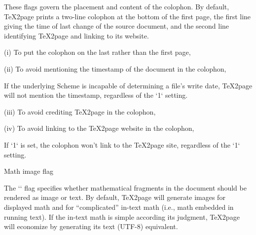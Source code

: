 These flags
govern the placement and content of the colophon.
By default, \TeX2page prints a two-line colophon at the
bottom of the first page, the first line giving
the time of last change of the source document, and the
second line identifying \TeX2page and linking to its website.

\item(i) To put the colophon on the last rather than the first page,

\begintt
\let\TZPcolophonlastpage=1
\endtt
%
\iffalse
\n If this request is to have meaning, it should be made in the document
before the text for the second HTML page starts.  Otherwise, the default
first-page placement of the colophon will have already taken effect.
\fi

\item(ii) To avoid mentioning the timestamp of the document in the
colophon,

\begintt
\let\TZPcolophondisabletimestamp=1
\endtt
%
If the underlying
Scheme is incapable of determining a file’s write date, \TeX2page will
not mention the timestamp, regardless of the `\TZPcolophondisabletimestamp` setting.

\item(iii) To avoid crediting \TeX2page in the colophon,

\begintt
\let\TZPcolophondisablecredit=1
\endtt

\item(iv) To avoid linking to the \TeX2page website in the colophon,

\begintt
\let\TZPcolophondisableweblink=1
\endtt
%
If `\TZPcolophondisablecredit` is set, the colophon won’t link to the \TeX2page
site, regardless of the `\TZPcolophondisableweblink` setting.

\beginsection Math image flag

The `\TZPmathtext` flag
specifies whether mathematical fragments in the
document should be rendered as image or text.  By default, \TeX2page will
generate images for displayed math and for “complicated”
in-text math (i.e., math embedded in running text).   If the
in-text math is simple according its judgment, \TeX2page will
economize by generating its text (UTF-8) equivalent.

